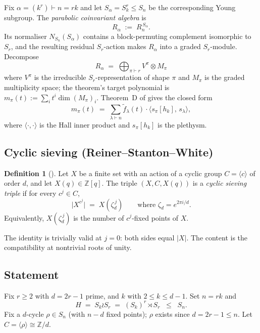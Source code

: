 \documentclass[11pt]{article}
\theoremstyle{definition}
\newtheorem*{definition*}{Definition}
\theoremstyle{remark}
\newcommand{\fdeg}{\widetilde{f}}
\newcommand{\ZZ}{\mathbb{Z}}
\begin{document}
Fix $\alpha = (k^r) \vdash n = rk$ and let $S_\alpha = S_k^r \le S_n$ be the corresponding Young subgroup.  The \emph{parabolic coinvariant algebra} is
\[
R_\alpha \;:=\; R_n^{\,S_\alpha}.
\]
Its normaliser $N_{S_n}(S_\alpha)$ contains a block-permuting complement isomorphic to $S_r$, and the resulting residual $S_r$-action makes $R_\alpha$ into a graded $S_r$-module.  Decompose
\[
R_\alpha \;=\; \bigoplus_{\pi \vdash r} V^\pi \otimes M_\pi
\]
where $V^\pi$ is the irreducible $S_r$-representation of shape $\pi$ and $M_\pi$ is the graded multiplicity space; the theorem's target polynomial is $m_\pi(t) := \sum_i t^i \dim (M_\pi)_i$.  Theorem~D of \cite{Wreath-general-r} gives the closed form
\begin{equation}
\label{eq:thmD}
m_\pi(t) \;=\; \sum_{\lambda \vdash n} \fdeg_\lambda(t) \cdot \langle s_\pi[h_k],\, s_\lambda\rangle,
\end{equation}
where $\langle \cdot,\cdot\rangle$ is the Hall inner product and $s_\pi[h_k]$ is the plethysm.

\subsection*{Cyclic sieving (Reiner--Stanton--White)}

\begin{definition*}[\cite{RSW}]
Let $X$ be a finite set with an action of a cyclic group $C = \langle c\rangle$ of order $d$, and let $X(q) \in \ZZ[q]$.  The triple $(X, C, X(q))$ is a \emph{cyclic sieving triple} if for every $c^j \in C$,
\[
\bigl| X^{c^j} \bigr| \;=\; X(\zeta_d^{\,j})
\qquad \text{where } \zeta_d = e^{2\pi i / d}.
\]
Equivalently, $X(\zeta_d^{\,j})$ is the number of $c^j$-fixed points of $X$.
\end{definition*}

The identity is trivially valid at $j = 0$: both sides equal $|X|$.  The content is the compatibility at nontrivial roots of unity.

\subsection*{Statement}

Fix $r \ge 2$ with $d = 2r - 1$ prime, and $k$ with $2 \le k \le d - 1$.  Set $n = rk$ and
\[
H \;=\; S_k \wr S_r \;=\; (S_k)^r \rtimes S_r \;\;\le\;\; S_n.
\]
Fix a $d$-cycle $\rho \in S_n$ (with $n - d$ fixed points); $\rho$ exists since $d = 2r - 1 \le n$.  Let $C = \langle \rho\rangle \cong \ZZ/d$.
\end{document}
